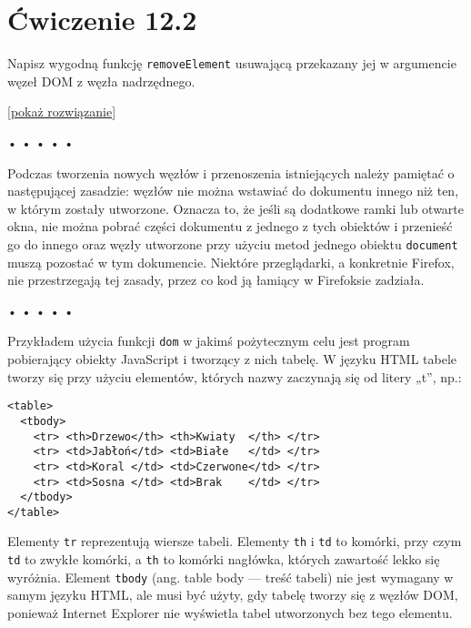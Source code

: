   
\section*{Ćwiczenie 12.2}
\label{sec:12.2}
  
    
Napisz wygodną funkcję \texttt{removeElement} usuwającą przekazany jej w argumencie węzeł DOM z węzła nadrzędnego.

  
[\hyperref[sol:12.2]{pokaż rozwiązanie}]


\begin{center}
• • • • •
\end{center}

  
Podczas tworzenia nowych węzłów i przenoszenia istniejących należy pamiętać o następującej zasadzie: węzłów nie można wstawiać do dokumentu innego niż ten, w którym zostały utworzone. Oznacza to, że jeśli są dodatkowe ramki lub otwarte okna, nie można pobrać części dokumentu z jednego z tych obiektów i przenieść go do innego oraz węzły utworzone przy użyciu metod jednego obiektu \texttt{document} muszą pozostać w tym dokumencie. Niektóre przeglądarki, a konkretnie Firefox, nie przestrzegają tej zasady, przez co kod ją łamiący w Firefoksie zadziała.


\begin{center}
• • • • •
\end{center}

  
Przykładem użycia funkcji \texttt{dom} w jakimś pożytecznym celu jest program pobierający obiekty JavaScript i tworzący z nich tabelę. W języku HTML tabele tworzy się przy użyciu elementów, których nazwy zaczynają się od litery „t”, np.:

  
\begin{verbatim} 
<table>
  <tbody>
    <tr> <th>Drzewo</th> <th>Kwiaty  </th> </tr>
    <tr> <td>Jabłoń</td> <td>Białe   </td> </tr>
    <tr> <td>Koral </td> <td>Czerwone</td> </tr>
    <tr> <td>Sosna </td> <td>Brak    </td> </tr>
  </tbody>
</table>
\end{verbatim}
  
Elementy \texttt{tr} reprezentują wiersze tabeli. Elementy \texttt{th} i \texttt{td} to komórki, przy czym \texttt{td} to zwykłe komórki, a \texttt{th} to komórki nagłówka, których zawartość lekko się wyróżnia. Element \texttt{tbody} (ang. table body — treść tabeli) nie jest wymagany w samym języku HTML, ale musi być użyty, gdy tabelę tworzy się z węzłów DOM, ponieważ Internet Explorer nie wyświetla tabel utworzonych bez tego elementu.


